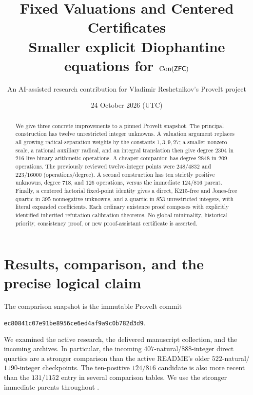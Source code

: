 \documentclass[11pt,letterpaper]{article}
\title{Fixed Valuations and Centered Certificates\\[3pt]\large Smaller explicit Diophantine equations for $\operatorname{Con}(\mathsf{ZFC})$}
\author{An AI-assisted research contribution for Vladimir Reshetnikov's ProveIt project}
\date{24 October 2026 (UTC)}
\theoremstyle{definition}\newtheorem{definition}[theorem]{Definition}
\theoremstyle{remark}\newtheorem{remark}[theorem]{Remark}
\begin{document}
\maketitle
\begin{abstract}
We give three concrete improvements to a pinned ProveIt snapshot. The principal construction has twelve unrestricted integer unknowns. A valuation argument replaces all growing radical-separation weights by the constants $1,3,9,27$; a smaller nonzero scale, a rational auxiliary radical, and an integral translation then give degree $2304$ in $216$ live binary arithmetic operations. A cheaper companion has degree $2848$ in $209$ operations. The previously reviewed twelve-integer points were $248/4832$ and $223/16000$ (operations/degree). A second construction has ten strictly positive unknowns, degree $718$, and $126$ operations, versus the immediate $124/816$ parent. Finally, a centered factorial fixed-point identity gives a direct, K215-free and Jones-free quartic in $395$ nonnegative unknowns, and a quartic in $853$ unrestricted integers, with literal expanded coefficients. Each ordinary existence proof composes with explicitly identified inherited refutation-calibration theorems. No global minimality, historical priority, consistency proof, or new proof-assistant certificate is asserted.
\end{abstract}
\tableofcontents
\newpage

\section{Results, comparison, and the precise logical claim}
The comparison snapshot is the immutable ProveIt commit
\begin{center}\small\texttt{ec80841c07e91be8956ce6ed4af9a9c0b782d3d9}.\end{center}
We examined the active research, the delivered manuscript collection, and the incoming archives. In particular, the incoming $407$-natural/$888$-integer direct quartics are a stronger comparison than the active README's older $522$-natural/$1190$-integer checkpoints. The ten-positive $124/816$ candidate is also more recent than the $131/1152$ entry in several comparison tables. We use the stronger immediate parents throughout \cite{repo,latest,interp,parent10,direct407}.
\end{document}
